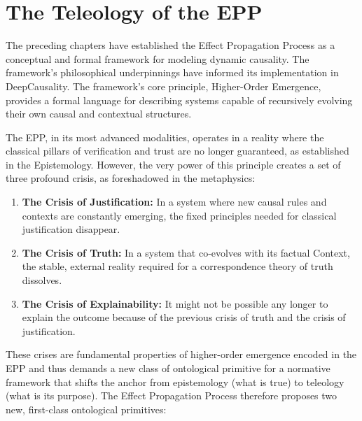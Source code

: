 \section{The Teleology of the EPP}
\label{sec:teleology}



The preceding chapters have established the Effect Propagation Process as a conceptual and formal framework for modeling dynamic causality. 
The framework's  philosophical underpinnings have informed its implementation in DeepCausality. The framework's core principle, 
Higher-Order Emergence, provides a formal language for describing systems capable of recursively evolving their own causal and contextual structures.

The EPP, in its most advanced modalities, operates in a reality where the classical pillars of verification and trust are no longer guaranteed,
as established in the Epistemology. However, the very power of this principle creates a set of three profound crisis,
 as foreshadowed in the metaphysics: 

\begin{enumerate}
	\item \textbf{The Crisis of Justification:} In a system where new causal rules and contexts are constantly emerging, the fixed principles needed for classical justification disappear.
	\item \textbf{The Crisis of Truth:} In a system that co-evolves with its factual Context, the stable, external reality required for a correspondence theory of truth dissolves.
	\item \textbf{The Crisis of Explainability:} It might not be possible any longer to explain the outcome because of the previous crisis of truth and the crisis of justification. 
\end{enumerate}


These crises are fundamental properties of higher-order emergence encoded in the EPP and thus demands a new class of ontological primitive for a normative framework that shifts the  anchor from epistemology (what is true) to teleology (what is its purpose). 
The Effect Propagation Process therefore proposes two new, first-class ontological primitives:

